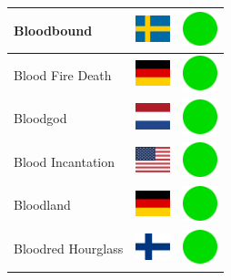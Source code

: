 \documentclass[12pt, a4paper, twoside]{report}
\begin{document}
\begin{center}
\begin{longtable}{|p{5cm}|p{2cm}|p{2cm}|}
Bloodbound & \includegraphics[width=1cm]{4x3/se} & \includegraphics[width=1cm]{likes/y} \\ \hline
Blood Fire Death & \includegraphics[width=1cm]{4x3/de} & \includegraphics[width=1cm]{likes/y} \\ \hline
Bloodgod & \includegraphics[width=1cm]{4x3/nl} & \includegraphics[width=1cm]{likes/y} \\ \hline
Blood Incantation & \includegraphics[width=1cm]{4x3/us} & \includegraphics[width=1cm]{likes/y} \\ \hline
Bloodland & \includegraphics[width=1cm]{4x3/de} & \includegraphics[width=1cm]{likes/y} \\ \hline
Bloodred Hourglass & \includegraphics[width=1cm]{4x3/fi} & \includegraphics[width=1cm]{likes/y} \\ \hline

\end{longtable}
\end{center}
\end{document}
